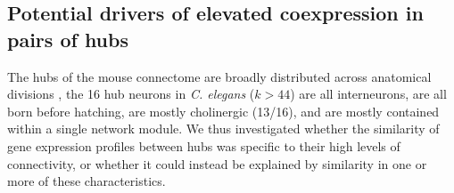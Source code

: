 \documentclass[10pt,letterpaper]{article}
\begin{document}
\subsection*{Potential drivers of elevated coexpression in pairs of hubs}
The hubs of the mouse connectome are broadly distributed across anatomical divisions \cite{Fulcher:2016ck}, the 16 hub neurons in \emph{C. elegans} ($k > 44$) are all interneurons, are all born before hatching, are mostly cholinergic (13/16), and are mostly contained within a single network module.
We thus investigated whether the similarity of gene expression profiles between hubs was specific to their high levels of connectivity, or whether it could instead be explained by similarity in one or more of these characteristics.


\end{document}
